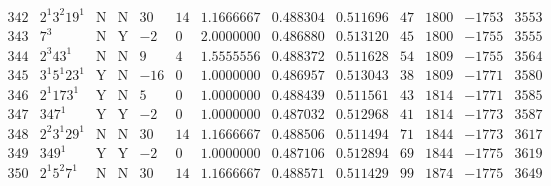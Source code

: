 \documentclass[11pt,reqno,a4letter]{article}
\numberwithin{equation}{section}
\numberwithin{figure}{section}
\numberwithin{table}{section}
\theoremstyle{plain}
\numberwithin{theorem}{section}
\theoremstyle{definition}
\begin{document}
\begin{table}[ht]
\begin{equation*}
{\begin{array}{cc|cc|ccc|cc|cccc}
 342 & 2^1 3^2 19^1 & \text{N} & \text{N} & 30 & 14 & 1.1666667 & 0.488304 & 0.511696 & 47 & 1800 & -1753 & 3553 \\
 343 & 7^3 & \text{N} & \text{Y} & -2 & 0 & 2.0000000 & 0.486880 & 0.513120 & 45 & 1800 & -1755 & 3555 \\
 344 & 2^3 43^1 & \text{N} & \text{N} & 9 & 4 & 1.5555556 & 0.488372 & 0.511628 & 54 & 1809 & -1755 & 3564 \\
 345 & 3^1 5^1 23^1 & \text{Y} & \text{N} & -16 & 0 & 1.0000000 & 0.486957 & 0.513043 & 38 & 1809 & -1771 & 3580 \\
 346 & 2^1 173^1 & \text{Y} & \text{N} & 5 & 0 & 1.0000000 & 0.488439 & 0.511561 & 43 & 1814 & -1771 & 3585 \\
 347 & 347^1 & \text{Y} & \text{Y} & -2 & 0 & 1.0000000 & 0.487032 & 0.512968 & 41 & 1814 & -1773 & 3587 \\
 348 & 2^2 3^1 29^1 & \text{N} & \text{N} & 30 & 14 & 1.1666667 & 0.488506 & 0.511494 & 71 & 1844 & -1773 & 3617 \\
 349 & 349^1 & \text{Y} & \text{Y} & -2 & 0 & 1.0000000 & 0.487106 & 0.512894 & 69 & 1844 & -1775 & 3619 \\
 350 & 2^1 5^2 7^1 & \text{N} & \text{N} & 30 & 14 & 1.1666667 & 0.488571 & 0.511429 & 99 & 1874 & -1775 & 3649 \\
\end{array}
}
\end{equation*}
\clearpage 

\end{table} 
\end{document}

